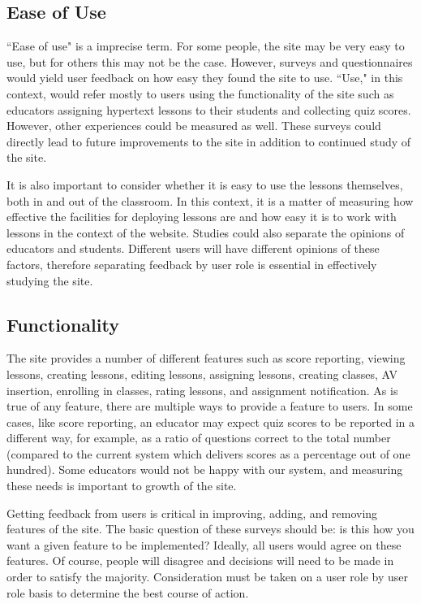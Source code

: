 \documentclass{acm_proc_article-sp}
\begin{document}
\subsection{Ease of Use}
``Ease of use" is a imprecise term. For some people, the site may be very easy to use, but for others this may not be the case. However, surveys and questionnaires would yield user feedback on how easy they found the site to use. ``Use," in this context, would refer mostly to users using the functionality of the site such as educators assigning hypertext lessons to their students and collecting quiz scores. However, other experiences could be measured as well. These surveys could directly lead to future improvements to the site in addition to continued study of the site.

It is also important to consider whether it is easy to use the lessons themselves, both in and out of the classroom. In this context, it is a matter of measuring how effective the facilities for deploying lessons are and how easy it is to work with lessons in the context of the website. Studies could also separate the opinions of educators and students. Different users will have different opinions of these factors, therefore separating feedback by user role is essential in effectively studying the site.

\subsection{Functionality}
The site provides a number of different features such as score reporting, viewing lessons, creating lessons, editing lessons, assigning lessons, creating classes, AV insertion, enrolling in classes, rating lessons, and assignment notification. As is true of any feature, there are multiple ways to provide a feature to users. In some cases, like score reporting, an educator may expect quiz scores to be reported in a different way, for example, as a ratio of questions correct to the total number (compared to the current system which delivers scores as a percentage out of one hundred). Some educators would not be happy with our system, and measuring these needs is important to growth of the site.

Getting feedback from users is critical in improving, adding, and removing features of the site. The basic question of these surveys should be: is this how you want a given feature to be implemented? Ideally, all users would agree on these features. Of course, people will disagree and decisions will need to be made in order to satisfy the majority. Consideration must be taken on a user role by user role basis to determine the best course of action.
\end{document}
